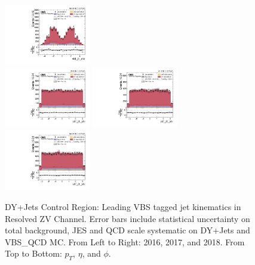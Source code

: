 \begin{figure}[!ht]
  \includegraphics[width=0.335\textwidth]{analysis_plots/2018_zjj/cr_vjets_l/vbf_j1_eta.pdf} \hspace{-10pt} \\
  \includegraphics[width=0.335\textwidth]{analysis_plots/2016_zjj/cr_vjets_l/vbf_j1_phi.pdf} \hspace{-10pt}
  \includegraphics[width=0.335\textwidth]{analysis_plots/2017_zjj/cr_vjets_l/vbf_j1_phi.pdf} \hspace{-10pt}
  \includegraphics[width=0.335\textwidth]{analysis_plots/2018_zjj/cr_vjets_l/vbf_j1_phi.pdf} \hspace{-10pt} \\
  \caption[DY+Jets Control Region: Leading VBS tagged jet kinematics in Resolved ZV Channel]%
  {DY+Jets Control Region: Leading VBS tagged jet kinematics in Resolved ZV Channel.
    Error bars include statistical uncertainty on total background,
    JES and QCD scale systematic on DY+Jets and VBS\_QCD MC\@. From Left to Right: 2016,
    2017, and 2018. From Top to Bottom: \( p_T \), \( \eta \), and \( \phi \).}%
  \label{fig:zjj-cr-vjets-l-vbs1-pt-eta-m}
\end{figure}

